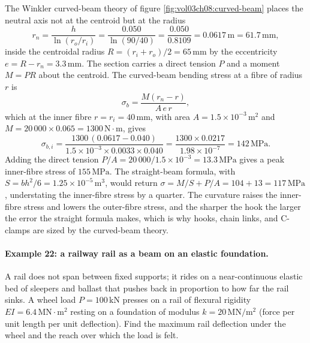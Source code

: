 The Winkler curved-beam theory of figure
\ref{fig:vol03ch08:curved-beam} places the neutral axis not at the
centroid but at the radius
\[
r_n = \frac{h}{\ln(r_o/r_i)}
= \frac{0.050}{\ln(90/40)} = \frac{0.050}{0.8109}
= 0.0617\,\si{\meter} = 61.7\,\si{\milli\meter},
\]
inside the centroidal radius $R = (r_i + r_o)/2 = 65\,\si{\milli\meter}$
by the eccentricity $e = R - r_n = 3.3\,\si{\milli\meter}$. The section
carries a direct tension $P$ and a moment $M = P R$ about the centroid.
The curved-beam bending stress at a fibre of radius $r$ is
\[
\sigma_b = \frac{M(r_n - r)}{A\,e\,r},
\]
which at the inner fibre $r = r_i = 40\,\si{\milli\meter}$, with area
$A = 1.5 \times 10^{-3}\,\si{\meter\squared}$ and $M = 20\,000 \times
0.065 = 1300\,\text{N}\cdot\text{m}$, gives
\[
\sigma_{b,i} = \frac{1300\,(0.0617 - 0.040)}
{1.5 \times 10^{-3} \times 0.0033 \times 0.040}
= \frac{1300 \times 0.0217}{1.98 \times 10^{-7}}
= 142\,\text{MPa}.
\]
Adding the direct tension $P/A = 20\,000/1.5\times 10^{-3} =
13.3\,\text{MPa}$ gives a peak inner-fibre stress of $155\,\text{MPa}$.
The straight-beam formula, with $S = bh^2/6 = 1.25 \times 10^{-5}\,
\si{\meter\cubed}$, would return $\sigma = M/S + P/A = 104 + 13 =
117\,\text{MPa}$, understating the inner-fibre stress by a quarter. The
curvature raises the inner-fibre stress and lowers the outer-fibre
stress, and the sharper the hook the larger the error the straight
formula makes, which is why hooks, chain links, and C-clamps are sized
by the curved-beam theory.



\paragraph{Example 22: a railway rail as a beam on an elastic
foundation.} A rail does not span between fixed supports; it rides on a
near-continuous elastic bed of sleepers and ballast that pushes back in
proportion to how far the rail sinks. A wheel load $P = 100\,\text{kN}$
presses on a rail of flexural rigidity $EI = 6.4\,\text{MN}\cdot\si{
\meter\squared}$ resting on a foundation of modulus $k = 20\,\text{MN}/
\si{\meter\squared}$ (force per unit length per unit deflection). Find
the maximum rail deflection under the wheel and the reach over which the
load is felt.

